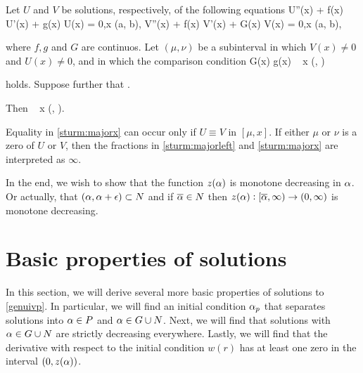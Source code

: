 \begin{theorem}
    Let $U$ and $V$ be solutions, respectively, of the following equations
    \be \label{sturm:uivp}
        U''(x) + f(x) U'(x) + g(x) U(x) = 0,\quad x \in (a, b),
    \ee
    \be \label{sturm:vivp}
        V''(x) + f(x) V'(x) + G(x) V(x) = 0,\quad x \in (a, b),
    \ee
    
    where $f, g$ and $G$ are continuos. Let $(\mu, \nu)$ be a subinterval in
    which $V(x) \neq 0$ and $U(x) \neq 0$, and in which the comparison condition 
    \be \label{sturm:compare}
        G(x) \geq g(x) \quad {} ~ x \in (\mu, \nu)
    \ee
    
    holds. Suppose further that
    \be \label{sturm:majorleft}
         \leq {}.
    \ee

    Then
    \be \label{sturm:majorx}
         \leq {}\quad {} ~ x \in
        (\mu, \nu).
    \ee

    Equality in \eqref{sturm:majorx} can occur only if $U \equiv V$ in $[\mu,
    x]$. If either $\mu$ or $\nu$ is a zero of $U$ or $V$, then the fractions in
    \eqref{sturm:majorleft} and \eqref{sturm:majorx} are interpreted as
    $\infty$. 

\end{theorem}

{\red In the end, we wish to show that the function $z(\alpha)$ is monotone decreasing in
$\alpha$. Or actually, that $(\alpha, \alpha+\epsilon)\subset N$ and if $\overline{\alpha}\in N$ then $z(\alpha) :
[\overline{\alpha}, \infty)\to(0,\infty)$ is monotone decreasing.}


\section{Basic properties of solutions}
In this section, we will derive several more basic properties of solutions to
\eqref{genuivp}. In particular, we will find an initial condition $\alpha_p$ that
separates solutions into $\alpha \in P$ and $\alpha \in G \cup N$. Next, we will find
that solutions with $\alpha \in G \cup N$ are strictly decreasing everywhere.
Lastly, we will find that the derivative with respect to the initial condition
$w(r)$ has at least one zero in the interval $(0, z(\alpha))$. 

